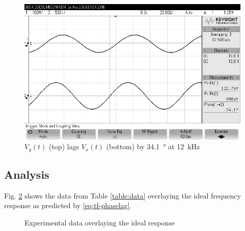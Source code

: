 \begin{figure}[tbph]
	\centering
	\includegraphics[width=0.65\linewidth]{graphics/12khz_phase_lag}
	\caption{$V_y(t)$ (top) lags $V_x(t)$ (bottom) by \SI{34.1}{\degree} at \SI{12}{\kilo\hertz}}
	\label{fig:scope}
\end{figure}

\subsection{Analysis}

Fig. \ref{fig:freq-response} shows the data from Table \ref{table:data} overlaying the ideal frequency response as predicted by \eqref{eq:tf-phaselag}.

\begin{figure}[htpb]
	\centering
	\caption{Experimental data overlaying the ideal response}
	\label{fig:freq-response}
\end{figure}
